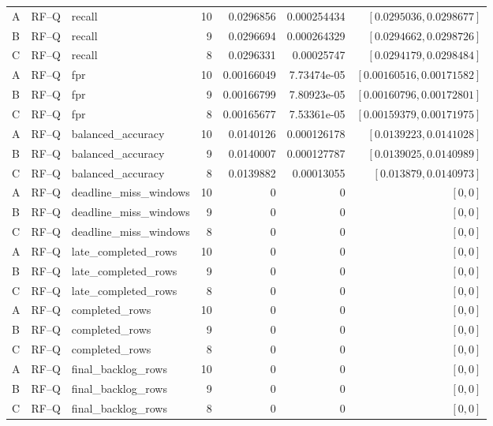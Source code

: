\begin{longtable}{lllrrrr}
A & RF--Q & recall & 10 & 0.0296856 & 0.000254434 & $[0.0295036,0.0298677]$\\
B & RF--Q & recall & 9 & 0.0296694 & 0.000264329 & $[0.0294662,0.0298726]$\\
C & RF--Q & recall & 8 & 0.0296331 & 0.00025747 & $[0.0294179,0.0298484]$\\
A & RF--Q & fpr & 10 & 0.00166049 & 7.73474e-05 & $[0.00160516,0.00171582]$\\
B & RF--Q & fpr & 9 & 0.00166799 & 7.80923e-05 & $[0.00160796,0.00172801]$\\
C & RF--Q & fpr & 8 & 0.00165677 & 7.53361e-05 & $[0.00159379,0.00171975]$\\
A & RF--Q & balanced\_accuracy & 10 & 0.0140126 & 0.000126178 & $[0.0139223,0.0141028]$\\
B & RF--Q & balanced\_accuracy & 9 & 0.0140007 & 0.000127787 & $[0.0139025,0.0140989]$\\
C & RF--Q & balanced\_accuracy & 8 & 0.0139882 & 0.00013055 & $[0.013879,0.0140973]$\\
A & RF--Q & deadline\_miss\_windows & 10 & 0 & 0 & $[0,0]$\\
B & RF--Q & deadline\_miss\_windows & 9 & 0 & 0 & $[0,0]$\\
C & RF--Q & deadline\_miss\_windows & 8 & 0 & 0 & $[0,0]$\\
A & RF--Q & late\_completed\_rows & 10 & 0 & 0 & $[0,0]$\\
B & RF--Q & late\_completed\_rows & 9 & 0 & 0 & $[0,0]$\\
C & RF--Q & late\_completed\_rows & 8 & 0 & 0 & $[0,0]$\\
A & RF--Q & completed\_rows & 10 & 0 & 0 & $[0,0]$\\
B & RF--Q & completed\_rows & 9 & 0 & 0 & $[0,0]$\\
C & RF--Q & completed\_rows & 8 & 0 & 0 & $[0,0]$\\
A & RF--Q & final\_backlog\_rows & 10 & 0 & 0 & $[0,0]$\\
B & RF--Q & final\_backlog\_rows & 9 & 0 & 0 & $[0,0]$\\
C & RF--Q & final\_backlog\_rows & 8 & 0 & 0 & $[0,0]$\\
\bottomrule\end{longtable}
